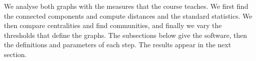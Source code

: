 We analyse both graphs with the measures that the course teaches. We first
find the connected components and compute distances and the standard
statistics. We then compare centralities and find communities, and finally we
vary the thresholds that define the graphs. The subsections below give the
software, then the definitions and parameters of each step. The results appear
in the next section.
